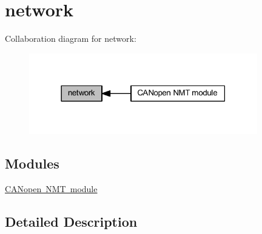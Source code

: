 \hypertarget{group___c_a_n}{}\section{network}
\label{group___c_a_n}
Collaboration diagram for network\+:
\nopagebreak
\begin{figure}[H]
\begin{center}
\leavevmode
\includegraphics[width=282pt]{group___c_a_n}
\end{center}
\end{figure}
\subsection*{Modules}
\begin{DoxyCompactItemize}
\item 
\mbox{\hyperlink{group___c_a_nopen___n_m_t__group}{C\+A\+Nopen N\+M\+T module}}
\end{DoxyCompactItemize}


\subsection{Detailed Description}
